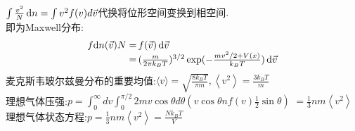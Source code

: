\documentclass[UTF8,8pt]{ctexart}
\begin{document}
\begin{multicols}{3}
        $\int \frac{v^2}{N}\mathop{}\!\mathrm{d} n=\int v^2f(v)d\vec{v}$代换将位形空间变换到相空间. \\
        即为Maxwell分布: 
        $$\ar{f{\d n(\vec{v})}{N}\x f(\vec{v})\d \vec v \\
        \x(\f{m}{2\pi k_BT})^{3/2}\exp (-\f{mv^2/2+V(x)}{k_BT})\d \vec v}$$
        麦克斯韦玻尔兹曼分布的重要均值:$\langle v\rangle=\sqrt{\frac{8 k_{B} T}{\pi m}},\left\langle v^{2}\right\rangle=\frac{3 k_{B} T}{m}$\\
        理想气体压强:$p=\int_{0}^{\infty} d v \int_{0}^{\pi / 2} 2 m v \cos \theta d \theta\left(v \cos \theta n f(v) \frac{1}{2} \sin \theta\right)$
        $=\frac{1}{3} n m\left\langle v^{2}\right\rangle$\\
        理想气体状态方程:$p=\frac{1}{3} n m\left\langle v^{2}\right\rangle=\frac{N k_{B} T}{V}$
\end{multicols}
\end{document}
